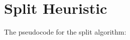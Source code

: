 


\section{Split Heuristic} %
\label{sec:split_heuristic}

The pseudocode for the split algorithm:


